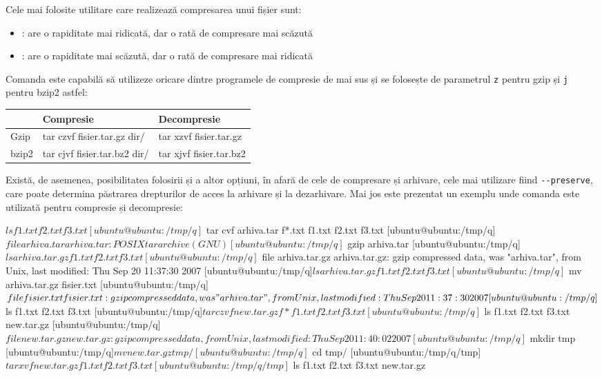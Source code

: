 Cele mai folosite utilitare care realizează compresarea unui fișier sunt:

\begin{itemize}
	\item {}: are o rapiditate mai ridicată, dar o rată de
		compresare mai scăzută
	\item {}: are o rapiditate mai scăzută, dar o rată de
		compresare mai ridicată
\end{itemize}

Comanda  este capabilă să utilizeze oricare dintre programele de
compresie de mai sus și se folosește de parametrul \texttt{z} pentru gzip și
\texttt{j} pentru bzip2 astfel:

\begin{table}[htb]
\begin{center}
	\begin{tabular}{ p{} p{} p{}}
	\toprule
	 & \textbf{Compresie} & \textbf{Decompresie} \\
	\midrule
		Gzip & tar czvf fisier.tar.gz dir/ & tar xzvf fisier.tar.gz \\
	\midrule
		bzip2 & tar cjvf fisier.tar.bz2 dir/ & tar xjvf fisier.tar.bz2 \\
	\bottomrule
	\end{tabular}
	\label{table:file-system-achivation-cmd}
\end{center}
\end{table}

Există, de asemenea, posibilitatea folosirii și a altor opțiuni, în afară de
cele de compresare și arhivare, cele mai utilizare fiind \texttt{-{}-preserve},
care poate determina păstrarea drepturilor de acces la arhivare și la
dezarhivare. Mai jos este prezentat un exemplu unde comanda  este
utilizată pentru compresie și decompresie:

\begin{screen}
$ ls
f1.txt  f2.txt  f3.txt
[ubuntu@ubuntu:/tmp/q]$ tar cvf arhiva.tar f*.txt
f1.txt
f2.txt
f3.txt
[ubuntu@ubuntu:/tmp/q]$ file arhiva.tar
arhiva.tar: POSIX tar archive (GNU)
[ubuntu@ubuntu:/tmp/q]$ gzip arhiva.tar
[ubuntu@ubuntu:/tmp/q]$ ls
arhiva.tar.gz  f1.txt  f2.txt  f3.txt
[ubuntu@ubuntu:/tmp/q]$ file arhiva.tar.gz
arhiva.tar.gz: gzip compressed data, was "arhiva.tar", from Unix, last modified: Thu Sep 20 11:37:30 2007
[ubuntu@ubuntu:/tmp/q]$ ls
arhiva.tar.gz  f1.txt  f2.txt  f3.txt
[ubuntu@ubuntu:/tmp/q]$ mv arhiva.tar.gz fisier.txt
[ubuntu@ubuntu:/tmp/q]$ file fisier.txt
fisier.txt: gzip compressed data, was "arhiva.tar", from Unix, last modified: Thu Sep 20 11:37:30 2007
[ubuntu@ubuntu:/tmp/q]$ ls
f1.txt  f2.txt  f3.txt
[ubuntu@ubuntu:/tmp/q]$ tar czvf new.tar.gz f*
f1.txt
f2.txt
f3.txt
[ubuntu@ubuntu:/tmp/q]$ ls
f1.txt  f2.txt  f3.txt  new.tar.gz
[ubuntu@ubuntu:/tmp/q]$ file new.tar.gz
new.tar.gz: gzip compressed data, from Unix, last modified: Thu Sep 20 11:40:02 2007
[ubuntu@ubuntu:/tmp/q]$ mkdir tmp
[ubuntu@ubuntu:/tmp/q]$ mv new.tar.gz tmp/
[ubuntu@ubuntu:/tmp/q]$ cd tmp/
[ubuntu@ubuntu:/tmp/q/tmp]$ tar xvf new.tar.gz
f1.txt
f2.txt
f3.txt
[ubuntu@ubuntu:/tmp/q/tmp]$ ls
f1.txt  f2.txt  f3.txt  new.tar.gz
\end{screen}

